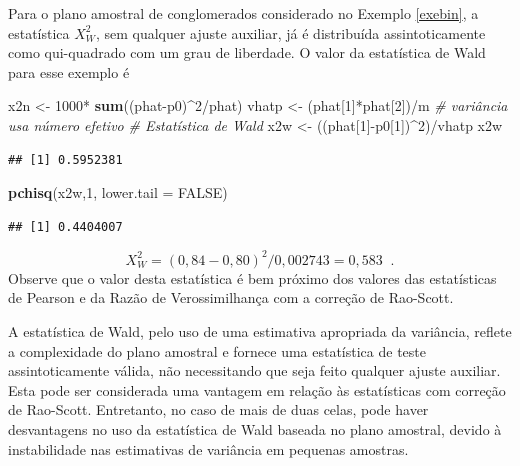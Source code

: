 \documentclass[]{book}
\newenvironment{Shaded}{\begin{snugshade}}{\end{snugshade}}
\newcommand{\KeywordTok}[1]{\textcolor[rgb]{0.13,0.29,0.53}{\textbf{{#1}}}}
\newcommand{\DataTypeTok}[1]{\textcolor[rgb]{0.13,0.29,0.53}{{#1}}}
\newcommand{\DecValTok}[1]{\textcolor[rgb]{0.00,0.00,0.81}{{#1}}}
\newcommand{\StringTok}[1]{\textcolor[rgb]{0.31,0.60,0.02}{{#1}}}
\newcommand{\CommentTok}[1]{\textcolor[rgb]{0.56,0.35,0.01}{\textit{{#1}}}}
\newcommand{\OtherTok}[1]{\textcolor[rgb]{0.56,0.35,0.01}{{#1}}}
\newcommand{\NormalTok}[1]{{#1}}
\numberwithin{example}{chapter}
\numberwithin{remark}{chapter}
\numberwithin{definition}{chapter}
\begin{document}
Para o plano amostral de conglomerados considerado no Exemplo
\ref{exebin}, a estatística \(X_{W}^{2}\), sem qualquer ajuste auxiliar,
já é distribuída assintoticamente como qui-quadrado com um grau de
liberdade. O valor da estatística de Wald para esse exemplo é

\begin{Shaded}
\begin{Highlighting}[]
\NormalTok{x2n <-}\StringTok{ }\DecValTok{1000}\NormalTok{*}\StringTok{ }\KeywordTok{sum}\NormalTok{((phat-p0)^}\DecValTok{2}\NormalTok{/phat)}
\NormalTok{vhatp <-}\StringTok{ }\NormalTok{(phat[}\DecValTok{1}\NormalTok{]*phat[}\DecValTok{2}\NormalTok{])/m }\CommentTok{# variância usa número efetivo}
\CommentTok{# Estatística de Wald}
\NormalTok{x2w <-}\StringTok{ }\NormalTok{((phat[}\DecValTok{1}\NormalTok{]-p0[}\DecValTok{1}\NormalTok{])^}\DecValTok{2}\NormalTok{)/vhatp}
\NormalTok{x2w}
\end{Highlighting}
\end{Shaded}

\begin{verbatim}
## [1] 0.5952381
\end{verbatim}

\begin{Shaded}
\begin{Highlighting}[]
\KeywordTok{pchisq}\NormalTok{(x2w,}\DecValTok{1}\NormalTok{, }\DataTypeTok{lower.tail =} \OtherTok{FALSE}\NormalTok{)}
\end{Highlighting}
\end{Shaded}

\begin{verbatim}
## [1] 0.4404007
\end{verbatim}

\[
X_{W}^{2}=\left( 0,84-0,80\right) ^{2}/0,002743=0,583\;\;\mbox{.} 
\] Observe que o valor desta estatística é bem próximo dos valores das
estatísticas de Pearson e da Razão de Verossimilhança com a correção de
Rao-Scott.

A estatística de Wald, pelo uso de uma estimativa apropriada da
variância, reflete a complexidade do plano amostral e fornece uma
estatística de teste assintoticamente válida, não necessitando que seja
feito qualquer ajuste auxiliar. Esta pode ser considerada uma vantagem
em relação às estatísticas com correção de Rao-Scott. Entretanto, no
caso de mais de duas celas, pode haver desvantagens no uso da
estatística de Wald baseada no plano amostral, devido à instabilidade
nas estimativas de variância em pequenas amostras.
\end{document}
